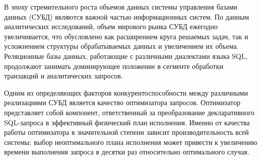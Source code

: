 \documentclass[fontsize=14pt, russian]{scrartcl}
\begin{document}
\sloppy

\def\figurename{Рисунок}

\newcommand{\sqlkw}[1]{\texttt{#1}}
\newcommand{\SELECT}{\sqlkw{SELECT}}
\newcommand{\FROM}{\sqlkw{FROM}}
\newcommand{\WHERE}{\sqlkw{WHERE}}
\newcommand{\JOIN}{\sqlkw{JOIN}}
\newcommand{\GROUPBY}{\sqlkw{GROUP BY}}
\newcommand{\ORDERBY}{\sqlkw{ORDER BY}}

\newcommand{\SeqScan}{\sqlkw{SeqScan}}
\newcommand{\HashJoin}{\sqlkw{HashJoin}}
\newcommand{\NestedLoopJoin}{\sqlkw{NestedLoopJoin}}
\newcommand{\Sort}{\sqlkw{Sort}}
\newcommand{\FilterOp}{\sqlkw{Filter}}
\newcommand{\ProjectionOp}{\sqlkw{Projection}}

\newcommand{\screenplaceholder}[3]{%
  \begin{figure}[H]
    \centering
    \fbox{%
      \begin{minipage}[c][2.5cm][c]{0.91\textwidth}
        \centering
        \textbf{МЕСТО ДЛЯ СКРИНШОТА}\\[0.4cm]
        #3
      \end{minipage}%
    }
    \caption{#1}
    \label{#2}
  \end{figure}
}

\newcommand{\graphplaceholder}[3]{%
  \begin{figure}[H]
    \centering
    \fbox{%
      \begin{minipage}[c][4.5cm][c]{0.91\textwidth}
        \centering
        \textbf{МЕСТО ДЛЯ ГРАФИКА}\\[0.4cm]
        #3
      \end{minipage}%
    }
    \caption{#1}
    \label{#2}
  \end{figure}
}

\setcounter{page}{2}

\newpage
\renewcommand\contentsname{\hfill{\normalfont{СОДЕРЖАНИЕ}}\hfill}
\tableofcontents
\newpage


В эпоху стремительного роста объемов данных системы управления базами данных
(СУБД) являются важной частью информационных систем. По данным аналитических
исследований, объем мирового рынка СУБД ежегодно увеличивается, что обусловлено
как расширением круга решаемых задач, так и усложнением структуры обрабатываемых
данных и увеличением их объема. Реляционные базы данных, работающие с различными
диалектами языка SQL, продолжают занимать доминирующее положение в сегменте
обработки транзакций и аналитических запросов.

Одним из определяющих факторов конкурентоспособности между различными
реализациями СУБД является качество оптимизатора запросов. Оптимизатор
представляет собой компонент, ответственный за преобразование декларативного
SQL-запроса в эффективный физический план исполнения. Именно от качества работы
оптимизатора в значительной степени зависит производительность всей системы:
выбор неоптимального плана исполнения может привести к увеличению времени
выполнения запроса в десятки раз относительно оптимального случая.
\end{document}
